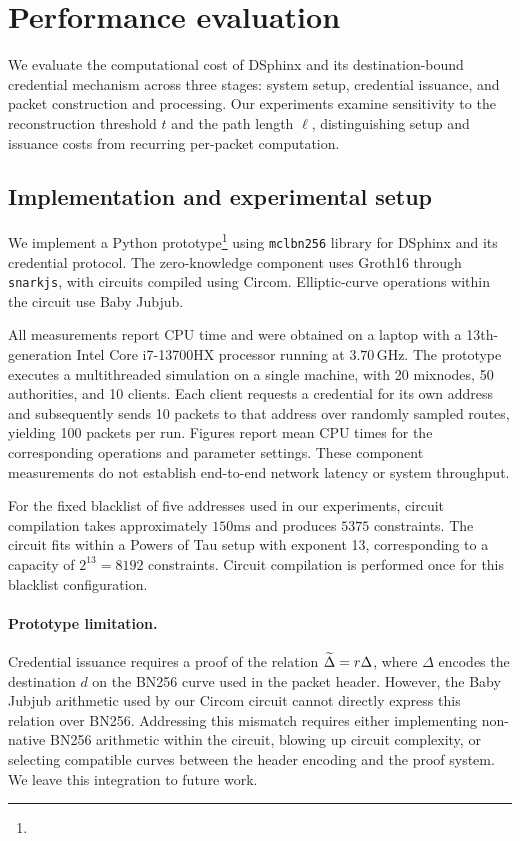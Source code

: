 \section{Performance evaluation}\label{sec:evaluation}

We evaluate the computational cost of DSphinx and its destination-bound credential mechanism across three stages: system setup, credential issuance, and packet construction and processing. 
Our experiments examine sensitivity to the reconstruction threshold $t$ and the path length $\ell$, distinguishing setup and issuance costs from recurring per-packet computation.

\subsection{Implementation and experimental setup}

We implement a Python prototype\footnote{\artifact} using \texttt{mclbn256} library for DSphinx and its credential protocol.
The zero-knowledge component uses Groth16 through \texttt{snarkjs}, with circuits compiled using Circom. 
Elliptic-curve operations within the circuit use Baby Jubjub.

All measurements report CPU time and were obtained on a laptop with a 13th-generation Intel Core i7-13700HX processor running at $3.70\,\mathrm{GHz}$. 
The prototype executes a multithreaded simulation on a single machine, with 20 mixnodes, 50 authorities, and 10 clients. 
Each client requests a credential for its own address and subsequently sends 10 packets to that address over randomly sampled routes, yielding 100 packets per run.
Figures report mean CPU times for the corresponding operations and parameter settings. 
These component measurements do not establish end-to-end network latency or system throughput.

For the fixed blacklist of five addresses used in our experiments, circuit compilation takes approximately $150 \mathrm{ms}$ and produces $5 375$ constraints.
The circuit fits within a Powers of Tau setup with exponent 13, corresponding to a capacity of $2^{13}=8 192$ constraints. 
Circuit compilation is performed once for this blacklist configuration.

\paragraph{Prototype limitation.}
Credential issuance requires a proof of the relation $\widetilde{\Delta}=r\Delta$, where $\Delta$ encodes the destination $d$ on the BN256 curve used in the packet header. 
However, the Baby Jubjub arithmetic used by our Circom circuit cannot directly express this relation over BN256. 
Addressing this mismatch requires either implementing non-native BN256 arithmetic within the circuit, blowing up circuit complexity, or selecting compatible curves between the header encoding and the proof system.
We leave this integration to future work.

